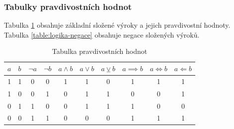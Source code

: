 \documentclass[12pt]{article}
\providecommand{\lxor}{\veebar}
\begin{document}
\subsubsection{Tabulky pravdivostních hodnot}
Tabulka \ref{table:logika-slozene} obsahuje základní složené výroky a jejich pravdivostní hodnoty. Tabulka \ref{table:logika-negace} obsahuje negace složených výroků.
\begin{table}[h!]
\centering
\begin{tabular}{|c|c|c|c|c|c|c|c|c|c|}
\hline
\multicolumn{1}{|l|}{$a$} & \multicolumn{1}{l|}{$b$} & \multicolumn{1}{l|}{$\neg a$} & \multicolumn{1}{l|}{$\neg b$} & \multicolumn{1}{l|}{$a \land b$} & \multicolumn{1}{l|}{$a \lor b$} & \multicolumn{1}{l|}{$a \lxor b$} & \multicolumn{1}{l|}{$ a \implies b$} & \multicolumn{1}{l|}{$a \iff b$} & \multicolumn{1}{l|}{$a\Longleftarrow  b$} \\ \hline
1                         & 1                        & 0                             & 0                             & 1                                & 1                               & 0                                & 1                                    & 1                               & 1                                         \\ \hline
1                         & 0                        & 0                             & 1                             & 0                                & 1                               & 1                                & 0                                    & 0                               & 1                                         \\ \hline
0                         & 1                        & 1                             & 0                             & 0                                & 1                               & 1                                & 1                                    & 0                               & 0                                         \\ \hline
0                         & 0                        & 1                             & 1                             & 0                                & 0                               & 0                                & 1                                    & 1                               & 1                                         \\ \hline
\end{tabular}
\caption{Tabulka pravdivostních hodnot}
\label{table:logika-slozene}
\end{table}
\end{document}
